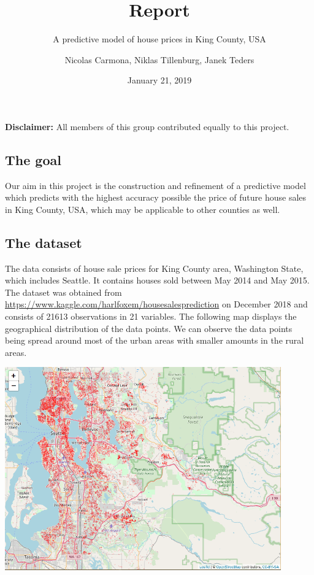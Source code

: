 \documentclass[table]{article}
\title{Report}
\subtitle{A predictive model of house prices in King County, USA}
\author{Nicolas Carmona, Niklas Tillenburg, Janek Teders}
\date{January 21, 2019}
\begin{document}
\maketitle

{
\setcounter{tocdepth}{4}
\tableofcontents
}
\hfill\break

\textbf{Disclaimer:} All members of this group contributed equally to
this project.

\newpage

\subsection{The goal}\label{the-goal}

Our aim in this project is the construction and refinement of a
predictive model which predicts with the highest accuracy possible the
price of future house sales in King County, USA, which may be applicable
to other counties as well.

\subsection{The dataset}\label{the-dataset}

The data consists of house sale prices for King County area, Washington
State, which includes Seattle. It contains houses sold between May 2014
and May 2015. The dataset was obtained from
\url{https://www.kaggle.com/harlfoxem/housesalesprediction} on December
2018 and consists of 21613 observations in 21 variables. The following
map displays the geographical distribution of the data points. We can
observe the data points being spread around most of the urban areas with
smaller amounts in the rural areas. \hfill\break

\begin{center}\includegraphics[width=450px]{King_county_map} \end{center}
\end{document}
